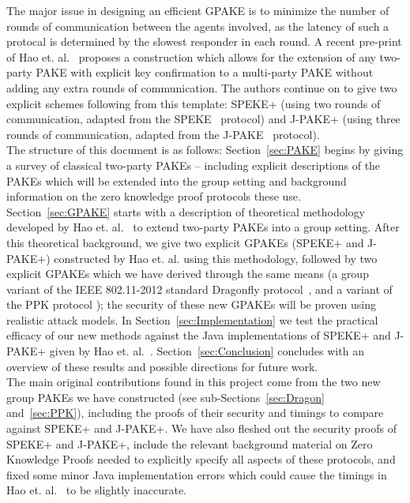 \documentclass{amsart}
\theoremstyle{remark}
\begin{document}
The major issue in designing an efficient GPAKE is to minimize the number of rounds of communication 
between the agents involved, as the latency of such a protocal is determined by the slowest responder 
in each round.  A recent pre-print of Hao et. al.~\cite{HaYiChSh15} proposes a construction which 
allows for the extension of any two-party PAKE with explicit key confirmation to a multi-party PAKE 
without adding any extra rounds of communication.  The authors continue on to give two explicit schemes 
following from this template: SPEKE+ (using two rounds of communication, adapted from the SPEKE~\cite{Ja96} 
protocol) and J-PAKE+ (using three rounds of communication, adapted from the J-PAKE~\cite{HaRy2010} protocol).
\\ 

The structure of this document is as follows: Section~\ref{sec:PAKE} begins by giving a survey of classical 
two-party PAKEs -- including explicit descriptions of the PAKEs which will be extended into the group 
setting and background information on the zero knowledge proof protocols these use.  Section~\ref{sec:GPAKE} 
starts with a description of theoretical methodology developed by Hao et. al.~\cite{HaYiChSh15} to extend 
two-party PAKEs into a group setting.  After this theoretical background, we give two explicit GPAKEs 
(SPEKE+ and J-PAKE+) constructed by Hao et. al. using this methodology, followed by two explicit GPAKEs 
which we have derived through the same means (a group variant of the IEEE 802.11-2012 standard Dragonfly 
protocol~\cite{Ha15}, and a variant of the PPK protocol \cite{BoMaPa00}); the security of these new GPAKEs will be proven using 
realistic attack models.  In Section~\ref{sec:Implementation} we test the practical efficacy of our new methods 
against the Java implementations of SPEKE+ and J-PAKE+ given by Hao et. al.~\cite{HaYiChSh15}.  Section~\ref{sec:Conclusion} 
concludes with an overview of these results and possible directions for future work.
\\ 

The main original contributions found in this project come from the two new group PAKEs we have constructed 
(see sub-Sections~\ref{sec:Dragon} and~\ref{sec:PPK}), including the proofs of their security and timings 
to compare against SPEKE+ and J-PAKE+.  We have also fleshed out the security proofs of SPEKE+ and J-PAKE+, 
include the relevant background material on Zero Knowledge Proofs needed to explicitly specify all aspects 
of these protocols, and fixed some minor Java implementation errors which could cause the timings in 
Hao et. al.~\cite{HaYiChSh15} to be slightly inaccurate.
\end{document}
